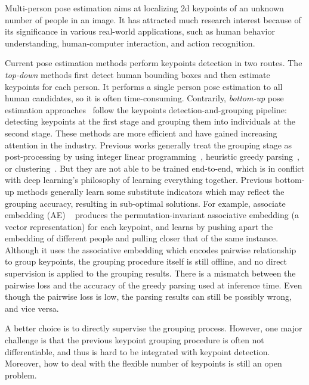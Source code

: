 \documentclass[runningheads]{llncs}
\begin{document}
	Multi-person pose estimation aims at localizing 2d keypoints of an unknown number of people in an image. It has attracted much research interest because of its significance in various real-world applications, such as human behavior understanding, human-computer interaction, and action recognition.
	
	Current pose estimation methods perform keypoints detection in two routes. The \emph{top-down} methods  \cite{chen2018cascaded,he2017mask,li2019crowdpose,papandreou2017towards,sun2019deep,sun2018integral,xiao2018simple} first detect human bounding boxes and then estimate keypoints for each person. It performs a single person pose estimation to all human candidates, so it is often time-consuming.
	Contrarily, \emph{bottom-up} pose estimation approaches~\cite{cao2017realtime,jin2019multi,newell2017associative,papandreou2018personlab} follow the keypoints detection-and-grouping pipeline: detecting keypoints at the first stage and grouping them into individuals at the second stage. These methods are more efficient and have gained increasing attention in the industry. 
	Previous works generally treat the grouping stage as post-processing by using integer linear programming~\cite{Insafutdinov2016ArtTrack,Insafutdinov2016DeeperCut,jin2017towards,pishchulin2016deepcut}, heuristic greedy parsing~\cite{cao2017realtime,papandreou2018personlab}, or clustering~\cite{newell2017associative,nie2017generative}. But they are not able to be trained end-to-end, which is in conflict with deep learning’s philosophy of learning everything together. Previous bottom-up methods generally learn some substitute indicators which may reflect the grouping accuracy, resulting in sub-optimal solutions. 
	For example, associate embedding (AE) ~\cite{newell2017associative} produces the permutation-invariant associative embedding (a vector representation) for each keypoint, and learns by pushing apart the embedding of different people and pulling closer that of the same instance. Although it uses the associative embedding which encodes pairwise relationship to group keypoints, the grouping procedure itself is still offline, and no direct supervision is applied to the grouping results. There is a mismatch between the pairwise loss and the accuracy of the greedy parsing used at inference time. Even though the pairwise loss is low, the parsing results can still be possibly wrong, and vice versa. 
	
	A better choice is to directly supervise the grouping process. 
	However, one major challenge is that the previous keypoint grouping procedure is often not differentiable, and thus is hard to be integrated with keypoint detection. Moreover, how to deal with the flexible number of keypoints is still an open problem.
	
\end{document}
